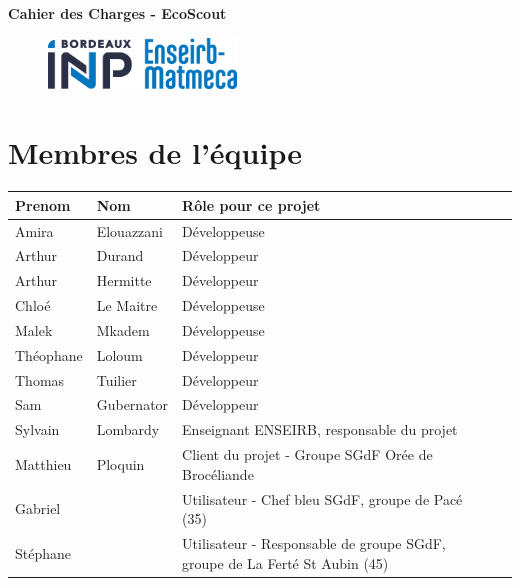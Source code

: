 


\begin{tcolorbox}
    
    \begin{center}
        \fontsize{17pt}{15pt}\selectfont
            \textbf{\color{black}Cahier des Charges - EcoScout}
        \selectfont
    \end{center}
\end{tcolorbox}


\begin{figure}[b]
    \begin{center}
        \includegraphics[width=5cm]{pictures/logoEnseirbMatmeca.jpg}
    \end{center}
\end{figure}

\newpage

\tableofcontents

\vspace{20px}

\section*{Membres de l'équipe}

\begin{table}[htbp]
    \centering
    \begin{tabular}{|l|l|l|p{4cm}|}
        \hline
        \textbf{Prenom} & \textbf{Nom} & \textbf{Rôle pour ce projet} \\
        \hline
        Amira & Elouazzani & Développeuse \\
        \hline
        Arthur & Durand & Développeur \\
        \hline
        Arthur & Hermitte & Développeur \\
        \hline
        Chloé & Le Maitre & Développeuse \\
        \hline
        Malek & Mkadem & Développeuse \\
        \hline
        Théophane & Loloum & Développeur \\
        \hline
        Thomas & Tuilier & Développeur \\
        \hline
        Sam & Gubernator & Développeur \\
        \hline
        Sylvain & Lombardy & Enseignant ENSEIRB, responsable du projet \\
        \hline
        Matthieu & Ploquin & Client du projet - Groupe SGdF Orée de Brocéliande \\
        \hline
        Gabriel & & Utilisateur - Chef bleu SGdF, groupe de Pacé (35) \\
        \hline
        Stéphane & & Utilisateur - Responsable de groupe SGdF, groupe de La Ferté St Aubin (45) \\
        \hline
    \end{tabular}
\end{table}

\newpage